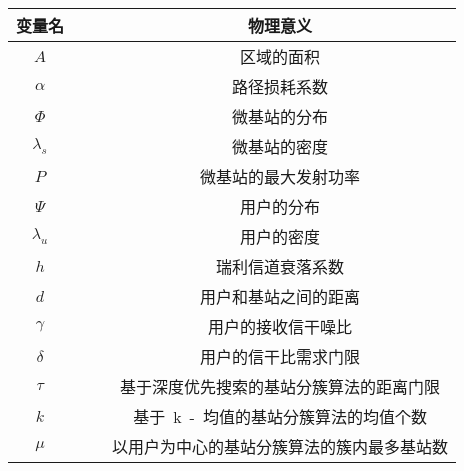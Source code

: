 

\makecover
\clearpage

{
%
\begin{table}[htbp]
\label{sinr_sim_para}
\vspace{0.5em}\centering\wuhao
\begin{tabular}{cccc}
\toprule[1.5pt]
变量名 & & & 物理意义 \\
\midrule[0.5pt]
$A$         & & & 区域的面积\tabularnewline
$\alpha$    & & & 路径损耗系数\tabularnewline
$\Phi$      & & & 微基站的分布\tabularnewline
$\lambda_s$ & & & 微基站的密度\tabularnewline
$P$         & & & 微基站的最大发射功率\tabularnewline
$\Psi$      & & & 用户的分布\tabularnewline
$\lambda_u$ & & & 用户的密度\tabularnewline
$h$         & & & 瑞利信道衰落系数\tabularnewline
$d$         & & & 用户和基站之间的距离\tabularnewline
$\gamma$    & & & 用户的接收信干噪比\tabularnewline
$\delta$    & & & 用户的信干比需求门限\tabularnewline
$\tau$      & & & 基于深度优先搜索的基站分簇算法的距离门限\tabularnewline
$k$         & & & 基于~k~-~均值的基站分簇算法的均值个数\tabularnewline
$\mu$       & & & 以用户为中心的基站分簇算法的簇内最多基站数\tabularnewline
\bottomrule[1.5pt]
\end{tabular}
\end{table}
}
